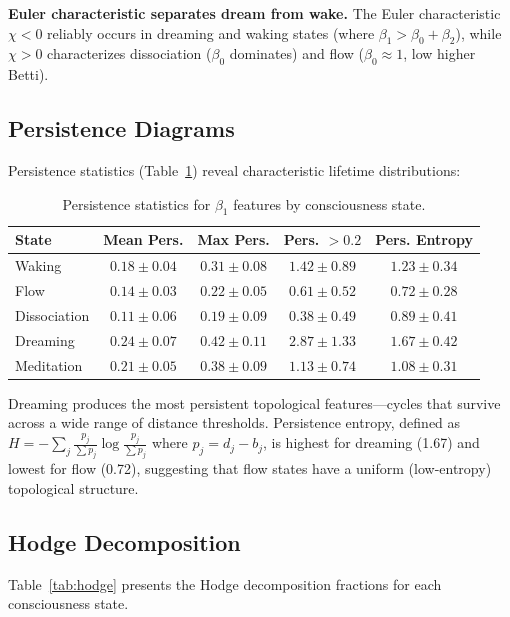 \documentclass[11pt,a4paper]{article}
\begin{document}
\textbf{Euler characteristic separates dream from wake.}
The Euler characteristic $\chi < 0$ reliably occurs in dreaming and waking states (where $\beta_1 > \beta_0 + \beta_2$), while $\chi > 0$ characterizes dissociation ($\beta_0$ dominates) and flow ($\beta_0 \approx 1$, low higher Betti).

\subsection{Persistence Diagrams}

Persistence statistics (Table~\ref{tab:persistence}) reveal characteristic lifetime distributions:

\begin{table}[h]
\centering
\caption{Persistence statistics for $\beta_1$ features by consciousness state.}
\label{tab:persistence}
\begin{tabular}{lcccc}
\toprule
\textbf{State} & \textbf{Mean Pers.} & \textbf{Max Pers.} & \textbf{Pers. $> 0.2$} & \textbf{Pers. Entropy} \\
\midrule
Waking       & $0.18 \pm 0.04$ & $0.31 \pm 0.08$ & $1.42 \pm 0.89$ & $1.23 \pm 0.34$ \\
Flow         & $0.14 \pm 0.03$ & $0.22 \pm 0.05$ & $0.61 \pm 0.52$ & $0.72 \pm 0.28$ \\
Dissociation & $0.11 \pm 0.06$ & $0.19 \pm 0.09$ & $0.38 \pm 0.49$ & $0.89 \pm 0.41$ \\
Dreaming     & $0.24 \pm 0.07$ & $0.42 \pm 0.11$ & $2.87 \pm 1.33$ & $1.67 \pm 0.42$ \\
Meditation   & $0.21 \pm 0.05$ & $0.38 \pm 0.09$ & $1.13 \pm 0.74$ & $1.08 \pm 0.31$ \\
\bottomrule
\end{tabular}
\end{table}

Dreaming produces the most persistent topological features---cycles that survive across a wide range of distance thresholds.
Persistence entropy, defined as $H = -\sum_j \frac{p_j}{\sum p_j} \log \frac{p_j}{\sum p_j}$ where $p_j = d_j - b_j$, is highest for dreaming (1.67) and lowest for flow (0.72), suggesting that flow states have a uniform (low-entropy) topological structure.

\subsection{Hodge Decomposition}

Table~\ref{tab:hodge} presents the Hodge decomposition fractions for each consciousness state.
\end{document}
